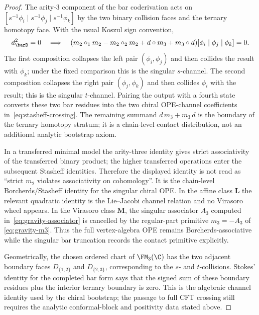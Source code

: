\begin{proof}
The arity-$3$ component of the bar coderivation acts on
$[s^{-1}\phi_i \mid s^{-1}\phi_j \mid s^{-1}\phi_k]$ by the two
binary collision faces and the ternary homotopy face. With the
usual Koszul sign convention,
\[
d_{\barB}^2 = 0
\quad\Longrightarrow\quad
(m_2 \circ_1 m_2 - m_2 \circ_2 m_2 + d \circ m_3
 + m_3 \circ d)
 [\phi_i \mid \phi_j \mid \phi_k] = 0.
\]
The first composition collapses the left pair
$(\phi_i,\phi_j)$ and then collides the result with \(\phi_k\);
under the fixed comparison this is the singular \(s\)-channel.
The second composition collapses the right pair
$(\phi_j,\phi_k)$ and then collides \(\phi_i\) with the result;
this is the singular \(t\)-channel. Pairing the output with a
fourth state converts these two bar residues into the two chiral
OPE-channel coefficients in~\eqref{eq:stasheff-crossing}. The
remaining summand \(d\,m_3+m_3\,d\) is the boundary of the
ternary homotopy stratum; it is a chain-level contact
distribution, not an additional analytic bootstrap axiom.

In a transferred minimal model the arity-three identity gives
strict associativity of the transferred binary product; the higher
transferred operations enter the subsequent Stasheff identities.
Therefore the displayed identity is not read as ``strict \(m_2\)
violates associativity on cohomology''.  It is the chain-level
Borcherds/Stasheff identity for the singular chiral OPE.  In the
affine class \(\mathbf L\) the relevant quadratic identity is the
Lie--Jacobi channel relation and no Virasoro wheel appears. In the
Virasoro class \(\mathbf M\), the singular
associator \(A_3\) computed in~\eqref{eq:gravity-associator} is
cancelled by the regular-part primitive \(m_3=-A_3\) of
\eqref{eq:gravity-m3}. Thus the full vertex-algebra OPE remains
Borcherds-associative while the singular bar truncation records
the contact primitive explicitly.

Geometrically, the chosen ordered chart of \(\FM_3(\C)\) has the
two adjacent boundary faces \(D_{\{1,2\}}\) and \(D_{\{2,3\}}\),
corresponding to the \(s\)- and \(t\)-collisions.  Stokes'
identity for the completed bar form says that the signed sum of
these boundary residues plus the interior ternary boundary is
zero.  This is the algebraic channel identity used by the chiral
bootstrap; the passage to full CFT crossing still requires the
analytic conformal-block and positivity data stated above.
\end{proof}

